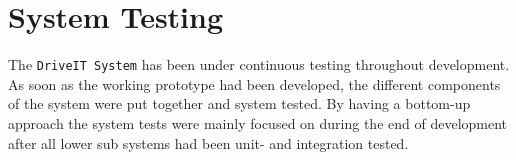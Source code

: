 \section{System Testing}
The \texttt{DriveIT System} has been under continuous testing throughout development.
As soon as the working prototype had been developed, the different components of the system were put together and system tested. 
By having a bottom-up approach the system tests were mainly focused on during the end of development after all lower sub systems had been unit- and integration tested.
